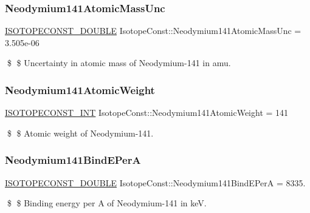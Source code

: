 \subsubsection{\texorpdfstring{Neodymium141\+Atomic\+Mass\+Unc}{Neodymium141AtomicMassUnc}}
{\footnotesize\ttfamily \mbox{\hyperlink{group___isotope_const-_macros_ga8f45a7272ce02c0b4c65c44636ed719a}{I\+S\+O\+T\+O\+P\+E\+C\+O\+N\+S\+T\+\_\+\+D\+O\+U\+B\+LE}} Isotope\+Const\+::\+Neodymium141\+Atomic\+Mass\+Unc = 3.\+505e-\/06}

\$ \$ Uncertainty in atomic mass of Neodymium-\/141 in amu. \mbox{\label{group___isotope_const-_neodymium-_nd141_ga2a490de726af02e1df717c9249edbe9c}} 
\subsubsection{\texorpdfstring{Neodymium141\+Atomic\+Weight}{Neodymium141AtomicWeight}}
{\footnotesize\ttfamily \mbox{\hyperlink{group___isotope_const-_macros_ga5f18360b3e99483a35c32d789e62621c}{I\+S\+O\+T\+O\+P\+E\+C\+O\+N\+S\+T\+\_\+\+I\+NT}} Isotope\+Const\+::\+Neodymium141\+Atomic\+Weight = 141}

\$ \$ Atomic weight of Neodymium-\/141. \mbox{\label{group___isotope_const-_neodymium-_nd141_ga07568d0a6d8049d00a1d1784c90356b9}} 
\subsubsection{\texorpdfstring{Neodymium141\+Bind\+E\+PerA}{Neodymium141BindEPerA}}
{\footnotesize\ttfamily \mbox{\hyperlink{group___isotope_const-_macros_ga8f45a7272ce02c0b4c65c44636ed719a}{I\+S\+O\+T\+O\+P\+E\+C\+O\+N\+S\+T\+\_\+\+D\+O\+U\+B\+LE}} Isotope\+Const\+::\+Neodymium141\+Bind\+E\+PerA = 8335.}

\$ \$ Binding energy per A of Neodymium-\/141 in keV. \mbox{\label{group___isotope_const-_neodymium-_nd141_ga716441acd132dc83a540920d15f9719d}} 
